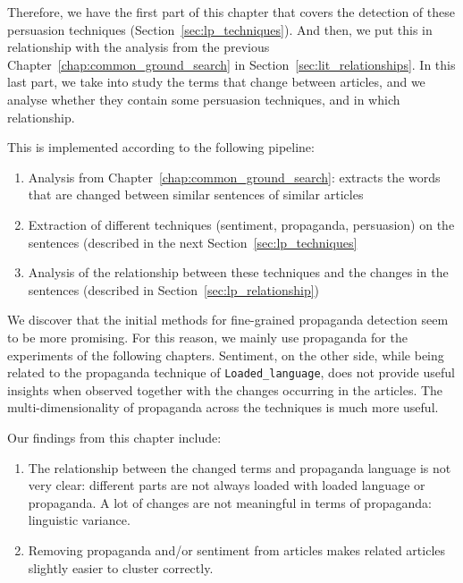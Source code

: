 Therefore, we have the first part of this chapter that covers the detection of these persuasion techniques (Section~\ref{sec:lp_techniques}).
And then, we put this in relationship with the analysis from the previous Chapter~\ref{chap:common_ground_search} in Section~\ref{sec:lit_relationships}.
In this last part, 
we take into study the terms that change between articles, and we analyse whether they contain some persuasion techniques, and in which relationship. %

This is implemented according to the following pipeline:
\begin{enumerate}
    \item Analysis from Chapter~\ref{chap:common_ground_search}: extracts the words that are changed between similar sentences of similar articles
    \item Extraction of different techniques (sentiment, propaganda, persuasion) on the sentences (described in the next Section~\ref{sec:lp_techniques}
    \item Analysis of the relationship between these techniques and the changes in the sentences (described in Section~\ref{sec:lp_relationship})
\end{enumerate}


We discover that
the initial methods for fine-grained propaganda detection seem to be more promising. For this reason, we mainly use propaganda for the experiments of the following chapters. 
Sentiment, on the other side, while being related to the propaganda technique of \texttt{Loaded\_language}, does not provide useful insights when observed together with the changes occurring in the articles. The multi-dimensionality of propaganda across the techniques is much more useful.

Our findings from this chapter include:
\begin{enumerate}
    \item The relationship between the changed terms and propaganda language is not very clear: different parts are not always loaded with loaded language or propaganda. A lot of changes are not meaningful in terms of propaganda: linguistic variance.
    \item Removing propaganda and/or sentiment from articles makes related articles slightly easier to cluster correctly.
\end{enumerate}


